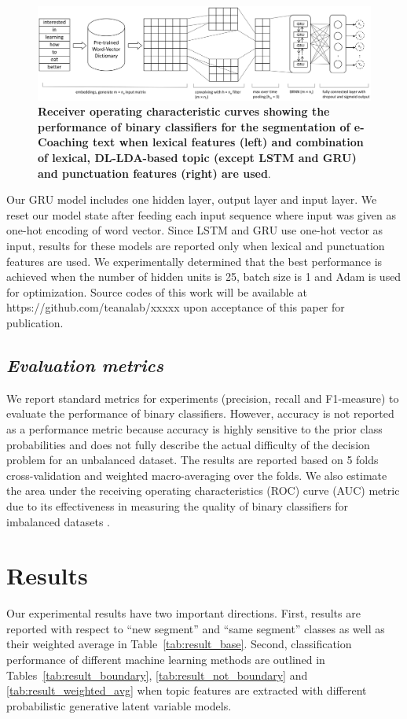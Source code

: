 \documentclass{amia}
\begin{document}
\begin{figure}[!htb]
    \centering
    \includegraphics[width=1.0\textwidth]{figures/CRNN.eps}
    \caption{\textbf{Receiver operating characteristic curves showing the performance of binary classifiers for the segmentation of e-Coaching text when lexical features (left) and combination of lexical, DL-LDA-based topic (except LSTM and GRU) and punctuation features (right) are used}.}
    \label{fig:crnn}
\end{figure}

Our GRU model includes one hidden layer, output layer and input layer. We reset our model state after feeding each input sequence where input was given as one-hot encoding of word vector. Since LSTM and GRU use one-hot vector as input, results for these models are reported only when lexical and punctuation features are used. We experimentally determined that the best performance is achieved when the number of hidden units is 25, batch size is 1 and Adam\cite{kingma2014adam} is used for optimization. Source codes of this work will be available at https://github.com/teanalab/xxxxx upon acceptance of this paper for publication.          
  
\subsection*{\textit{Evaluation metrics}}
We report standard metrics for experiments (precision, recall and F1-measure) to evaluate the performance of binary classifiers\cite{aas1999text}. However, accuracy is not reported as a performance metric because accuracy is highly sensitive to the prior class probabilities and does not fully describe the actual difficulty of the decision problem for an unbalanced dataset. The results are reported based on 5 folds cross-validation and weighted macro-averaging over the folds. We also estimate the area under the receiving operating characteristics (ROC) curve\cite{kumar2011receiver} (AUC) metric due to its effectiveness in measuring the quality of binary classifiers for imbalanced datasets \cite{hu2015kernelized}. 

\section*{Results}
Our experimental results have two important directions. First, results are reported with respect to ``new segment'' and ``same segment'' classes as well as their weighted average in Table~\ref{tab:result_base}. Second, classification performance of different machine learning methods are outlined in Tables~\ref{tab:result_boundary}, \ref{tab:result_not_boundary} and \ref{tab:result_weighted_avg} when topic features are extracted with different probabilistic generative latent variable models.\\
\end{document}
